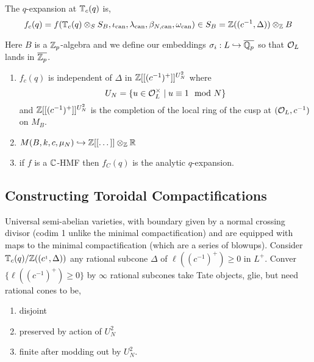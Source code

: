\documentclass[12pt]{article}
\begin{document}
\begin{defn}
The $q$-expansion at $\mathbb{T}_c(q)$ is,
\[ f_c(q) = f(\mathbb{T}_c(q) \otimes_S S_B, \iota_{\mathrm{can}}, \lambda_{\mathrm{can}}, \beta_{N, \mathrm{can}}, \omega_{\mathrm{can}}) \in S_B = \mathbb{Z}((c^{-1}, \Delta)) \otimes_{\mathbb{Z}} B \]
\end{defn}

\begin{rmk}
Here $B$ is a $\mathbb{Z}_p$-algebra and we define our embeddings $\sigma_i : L \hookrightarrow \overline{\mathbb{Q}_p}$ so that $\mathcal{O}_{L}$ lands in $\overline{\mathbb{Z}_p}$. 
\end{rmk}

\begin{theorem}
\begin{enumerate}
\item $f_c(q)$ is independent of $\Delta$ in $\mathbb{Z}[[(c^{-1})^+]]^{U_N^2}$ where 
\[ U_N = \{ u \in \mathcal{O}_{L}^\times \mid u \equiv 1 \mod N \} \]
and $\mathbb{Z}[[(c^{-1})^+]]^{U_N^2}$ is the completion of the local ring of the cusp at $(\mathcal{O}_{L}, c^{-1})$ on $M_B$. 
\item $M(B, k, c, \mu_N) \hookrightarrow \mathbb{Z}[[ \dots ]] \otimes_{\mathbb{Z}} \mathbb{R}$

\item if $f$ is a $\mathbb{C}$-HMF then $f_C(q)$ is the analytic $q$-expansion. 
\end{enumerate}
\end{theorem}

\subsection{Constructing Toroidal Compactifications}

Universal semi-abelian varieties, with boundary given by a normal crossing divisor (codim 1 unlike the minimal compactification) and are equipped with maps to the minimal compactification (which are a series of blowups). Consider $\mathbb{T}_c(q) / \mathbb{Z}((c^{_1}, \Delta))$ any rational subcone $\Delta$ of $\ell((c^{-1})^+) \ge 0$ in $L^+$. Conver $\{ \ell((c^{-1})^+) \ge 0 \}$ by $\infty$ rational subcones take Tate objects, glie, but need rational cones to be,
\begin{enumerate}
\item disjoint
\item preserved by action of $U_N^2$
\item finite after modding out by $U_N^2$.
\end{enumerate}
\end{document}
